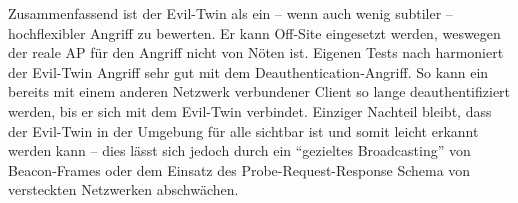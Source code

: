 Zusammenfassend ist der Evil-Twin als ein -- wenn auch wenig subtiler -- hochflexibler Angriff zu bewerten. Er kann Off-Site eingesetzt werden, weswegen der reale AP für den Angriff nicht von Nöten ist.
Eigenen Tests nach harmoniert der Evil-Twin Angriff sehr gut mit dem Deauthentication-Angriff.
So kann ein bereits mit einem anderen Netzwerk verbundener Client so lange deauthentifiziert werden, bis er sich mit dem Evil-Twin verbindet.
Einziger Nachteil bleibt, dass der Evil-Twin in der Umgebung für alle sichtbar ist und somit leicht erkannt werden kann -- dies lässt sich jedoch durch ein \enquote{gezieltes Broadcasting} von Beacon-Frames oder dem Einsatz des Probe-Request-Response Schema von versteckten Netzwerken abschwächen.